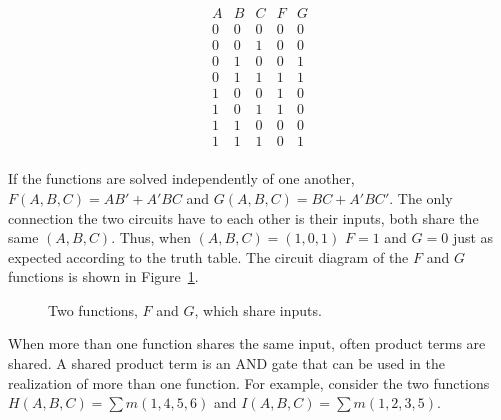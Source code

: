 \begin{process:minimizationKmap}
$$\begin{array}{c|c|c||c|c}
A & B & C & F & G \\ \hline
0 & 0 & 0 & 0 & 0 \\ \hline
0 & 0 & 1 & 0 & 0 \\ \hline
0 & 1 & 0 & 0 & 1 \\ \hline
0 & 1 & 1 & 1 & 1 \\ \hline
1 & 0 & 0 & 1 & 0 \\ \hline
1 & 0 & 1 & 1 & 0 \\ \hline
1 & 1 & 0 & 0 & 0 \\ \hline
1 & 1 & 1 & 0 & 1 \\
\end{array}$$

If the functions are solved independently of one another,
$F(A,B,C)=AB'+A'BC$ and $G(A,B,C) = BC + A'BC'$.  The only
connection the two circuits have to each other is their inputs, both
share the same $(A,B,C)$.  Thus, when $(A,B,C) = (1,0,1)$ 
$F=1$ and $G=0$ just as expected according to
the truth table.  The circuit diagram of the $F$ and $G$ 
functions is shown in Figure~\ref{fig:minimizationMultiOut}.

\begin{figure}[ht]
\caption{Two functions, $F$ and $G$, which share inputs.}
\label{fig:minimizationMultiOut}
\end{figure}

When more than one function shares the same input, 
often product terms are shared.  A shared product term is an AND
gate that can be used in the realization of more than one 
function.  For example, consider the two functions 
$H(A,B,C) = \sum m(1,4,5,6)$ and $I(A,B,C) = \sum m(1,2,3,5)$.
\label{page:DualFnc}
\end{process:minimizationKmap}
